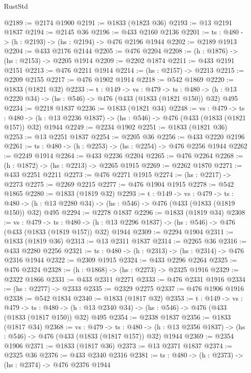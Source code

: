 \begin{lexlean}{RustStd}
\begin{coremodule}
@2189 := @2174 @1900
@2191 := @1833 (@1823 @36)
@2193 := @13 @2191 @1837
@2194 := @2145 @36
@2196 := @433 @2160 @2136
@2201 := {ts : @480} -> (h : @2193) -> (hs : @2194) -> @476 @2196 @1944
@2202 := @2189 @1913
@2204 := @433 @2176 @2144
@2205 := @476 @2204
@2208 := (h : @1876) -> (hs : @2153) -> @2205 @1914
@2209 := @2202 @1874
@2211 := @433 @2191 @2151
@2213 := @476 @2211 @1914
@2214 := (hs : @2157) -> @2213
@2215 := @2209 @2155
@2217 := @476 @1902 @1914
@2218 := @542 @1869
@2220 := @1833 (@1821 @32)
@2233 := {t : @149} ->
  {vs : @479} ->
  {ts : @480} -> (h : @13 @2220 @34) -> (hs : @546) -> @476 (@433 (@1833 (@1821 @150)) @32) @495
@2234 := @2218 @1837
@2236 := @1833 (@1821 @34)
@2248 := {vs : @479} ->
  {ts : @480} -> (h : @13 @2236 @1837) -> (hs : @546) -> @476 (@433 (@1833 (@1821 @157)) @32) @1944
@2249 := @2234 @1902
@2251 := @1833 (@1821 @36)
@2253 := @13 @2251 @1837
@2254 := @2205 @36
@2256 := @433 @2220 @2196
@2261 := {ts : @480} -> (h : @2253) -> (hs : @2254) -> @476 @2256 @1944
@2262 := @2249 @1914
@2264 := @433 @2236 @2204
@2265 := @476 @2264
@2268 := (h : @1872) -> (hs : @2213) -> @2265 @1915
@2269 := @2262 @1870
@2271 := @433 @2251 @2211
@2273 := @476 @2271 @1915
@2274 := (hs : @2217) -> @2273
@2275 := @2269 @2215
@2277 := @476 @1904 @1915
@2278 := @542 @1865
@2280 := @1833 (@1819 @32)
@2293 := {t : @149} ->
  {vs : @479} ->
  {ts : @480} -> (h : @13 @2280 @34) -> (hs : @546) -> @476 (@433 (@1833 (@1819 @150)) @32) @495
@2294 := @2278 @1837
@2296 := @1833 (@1819 @34)
@2308 := {vs : @479} ->
  {ts : @480} -> (h : @13 @2296 @1837) -> (hs : @546) -> @476 (@433 (@1833 (@1819 @157)) @32) @1944
@2309 := @2294 @1904
@2311 := @1833 (@1819 @36)
@2313 := @13 @2311 @1837
@2314 := @2265 @36
@2316 := @433 @2280 @2256
@2321 := {ts : @480} -> (h : @2313) -> (hs : @2314) -> @476 @2316 @1944
@2322 := @2309 @1915
@2324 := @433 @2296 @2264
@2325 := @476 @2324
@2328 := (h : @1868) -> (hs : @2273) -> @2325 @1916
@2329 := @2322 @1866
@2331 := @433 @2311 @2271
@2333 := @476 @2331 @1916
@2334 := (hs : @2277) -> @2333
@2335 := @2329 @2275
@2337 := @476 @1906 @1916
@2338 := @542 @1834
@2340 := @1833 (@1817 @32)
@2353 := {t : @149} ->
  {vs : @479} ->
  {ts : @480} -> (h : @13 @2340 @34) -> (hs : @546) -> @476 (@433 (@1833 (@1817 @150)) @32) @495
@2354 := @2338 @1837
@2356 := @1833 (@1817 @34)
@2368 := {vs : @479} ->
  {ts : @480} -> (h : @13 @2356 @1837) -> (hs : @546) -> @476 (@433 (@1833 (@1817 @157)) @32) @1944
@2369 := @2354 @1906
@2371 := @1833 (@1817 @36)
@2373 := @13 @2371 @1837
@2374 := @2325 @36
@2376 := @433 @2340 @2316
@2381 := {ts : @480} -> (h : @2373) -> (hs : @2374) -> @476 @2376 @1944

\end{coremodule}
\end{lexlean}
